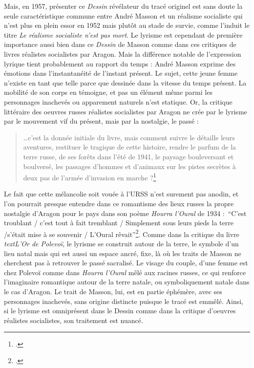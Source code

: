 	Mais, en 1957, présenter ce \emph{Dessin} révélateur du tracé originel est sans doute la seule caractéristique commune entre André Masson et un réalisme socialiste qui n’est plus en plein essor en 1952 mais plutôt au stade de survie, comme l’induit le titre \emph{Le réalisme socialiste n’est pas mort}. Le lyrisme est cependant de première importance aussi bien dans ce \emph{Dessin} de Masson comme dans ces critiques de livres réalistes socialistes par Aragon. Mais la différence notable de l’expression lyrique tient probablement au rapport du temps : André Masson exprime des émotions dans l’instantanéité de l’instant présent. Le sujet, cette jeune femme n’existe en tant que telle parce que dessinée dans la vitesse du temps présent. La mobilité de son corps en témoigne, et pas un élément même parmi les personnages inachevés ou apparement naturels n’est statique. Or, la critique littéraire des oeuvres russes réalistes socialistes par Aragon ne crée par le lyrisme par le mouvement vif du présent, mais par la nostalgie, le passé : 

\begin{quote}
…c’est la donnée initiale du livre, mais comment suivre le détaille leurs aventures, restituer le tragique de cette histoire, rendre le parfum de la terre russe, de ses forêts dans l’été de 1941, le paysage bouleversant et boulversé, les passages d’hommes et d’animaux sur les pistes secrètes à deux pas de l’armée d’invasion en marche ?\footcite{realsoc}\end{quote}	


Le fait que cette mélancolie soit vouée à l’URSS n’est surement pas anodin, et l’on pourrait presque entendre dans ce romantisme des lieux russes la propre nostalgie d’Aragon pour le pays dans son poème \emph{Hourra l’Oural} de 1934 : \enquote{C’est troublant / c’est tout à fait tremblant / Simplement sous leurs pieds la terre /s’était mise à se souvenir / L’Oural rêvait}\footcite{hourra}. Comme dans la critique du livre \emph{textL’Or de Polevoï}, le lyrisme se construit autour de la terre, le symbole d’un lieu natal mais qui est aussi un espace ancré, fixe, là où les traits de Masson ne cherchent pas à retrouver le passé sacralisé. Le visage du couple, d’une femme est chez Polevoï comme dans \emph{Hourra l’Oural} mêlé aux racines russes, ce qui renforce l’imaginaire romantique autour de la terre natale, ou symboliquement natale dans le cas d’Aragon. Le trait de Masson, lui, est en partie éphémère, avec ses personnages inachevés, sans origine distincte puisque le tracé est emmêlé. Ainsi, si le lyrisme est omniprésent dans le Dessin comme dans la critique d’oeuvres réalistes socialistes, son traitement est nuancé.


